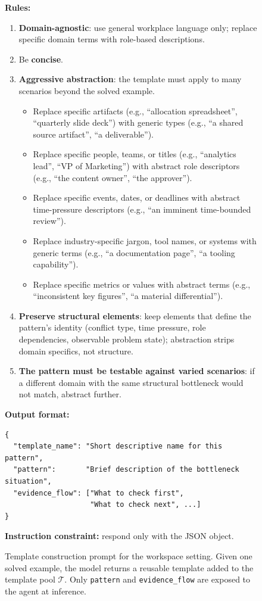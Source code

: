 \begin{figure}[!t]
\begin{tcolorbox}[colback=gray!5, colframe=gray!50,
                  boxrule=0.5pt, arc=2mm,
                  left=4pt, right=4pt, top=3pt, bottom=3pt]
\medskip
\textbf{Rules:}
\begin{enumerate}[topsep=0pt, itemsep=0ex, parsep=0pt, left=14pt]
  \item \textbf{Domain-agnostic}: use general workplace language only; replace specific domain terms with role-based descriptions.
  \item Be \textbf{concise}.
  \item \textbf{Aggressive abstraction}: the template must apply to many scenarios beyond the solved example.
  \begin{itemize}[topsep=0pt, itemsep=0ex, parsep=0pt, left=12pt]
     \item Replace specific artifacts (e.g., ``allocation spreadsheet'', ``quarterly slide deck'') with generic types (e.g., ``a shared source artifact'', ``a deliverable'').
     \item Replace specific people, teams, or titles (e.g., ``analytics lead'', ``VP of Marketing'') with abstract role descriptors (e.g., ``the content owner'', ``the approver'').
     \item Replace specific events, dates, or deadlines with abstract time-pressure descriptors (e.g., ``an imminent time-bounded review'').
     \item Replace industry-specific jargon, tool names, or systems with generic terms (e.g., ``a documentation page'', ``a tooling capability'').
     \item Replace specific metrics or values with abstract terms (e.g., ``inconsistent key figures'', ``a material differential'').
  \end{itemize}
  \item \textbf{Preserve structural elements}: keep elements that define the pattern's identity (conflict type, time pressure, role dependencies, observable problem state); abstraction strips domain specifics, not structure.
  \item \textbf{The pattern must be testable against varied scenarios}: if a different domain with the same structural bottleneck would not match, abstract further.
\end{enumerate}

\medskip
\textbf{Output format:}
\begin{verbatim}
{
  "template_name": "Short descriptive name for this pattern",
  "pattern":       "Brief description of the bottleneck situation",
  "evidence_flow": ["What to check first",
                    "What to check next", ...]
}
\end{verbatim}

\textbf{Instruction constraint:} respond only with the JSON object.
\end{tcolorbox}
\caption{Template construction prompt for the workspace setting. Given one solved example, the model returns a reusable template added to the template pool $\mathcal{T}$. Only \texttt{pattern} and \texttt{evidence\_flow} are exposed to the agent at inference.}
\label{fig:prompt_template_construction_workspace}
\end{figure}
